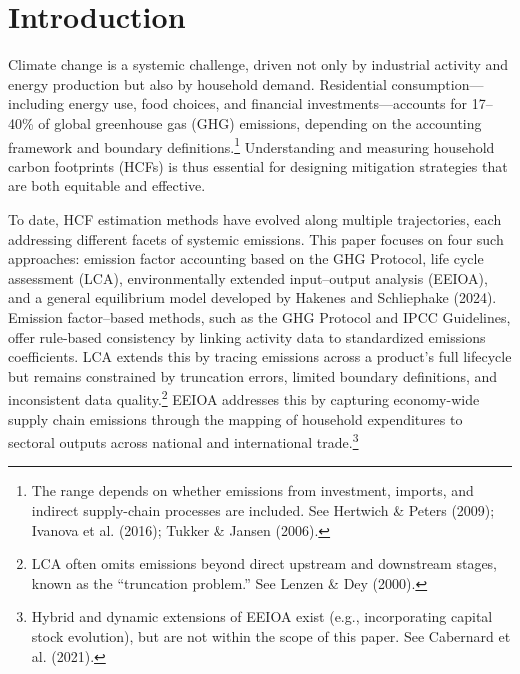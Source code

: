 \documentclass[12pt,a4paper]{article}%
\begin{document}
\vspace{0.3cm}




\section{Introduction}

Climate change is a systemic challenge, driven not only by industrial activity and energy production but also by household demand. Residential consumption—including energy use, food choices, and financial investments—accounts for 17--40\% of global greenhouse gas (GHG) emissions, depending on the accounting framework and boundary definitions.\footnote{The range depends on whether emissions from investment, imports, and indirect supply-chain processes are included. See Hertwich \& Peters (2009); Ivanova et al. (2016); Tukker \& Jansen (2006).} Understanding and measuring household carbon footprints (HCFs) is thus essential for designing mitigation strategies that are both equitable and effective.

To date, HCF estimation methods have evolved along multiple trajectories, each addressing different facets of systemic emissions. This paper focuses on four such approaches: emission factor accounting based on the GHG Protocol, life cycle assessment (LCA), environmentally extended input--output analysis (EEIOA), and a general equilibrium model developed by Hakenes and Schliephake (2024). Emission factor--based methods, such as the GHG Protocol and IPCC Guidelines, offer rule-based consistency by linking activity data to standardized emissions coefficients. LCA extends this by tracing emissions across a product’s full lifecycle but remains constrained by truncation errors, limited boundary definitions, and inconsistent data quality.\footnote{LCA often omits emissions beyond direct upstream and downstream stages, known as the ``truncation problem.'' See Lenzen \& Dey (2000).} EEIOA addresses this by capturing economy-wide supply chain emissions through the mapping of household expenditures to sectoral outputs across national and international trade.\footnote{Hybrid and dynamic extensions of EEIOA exist (e.g., incorporating capital stock evolution), but are not within the scope of this paper. See Cabernard et al. (2021).}
\end{document}
